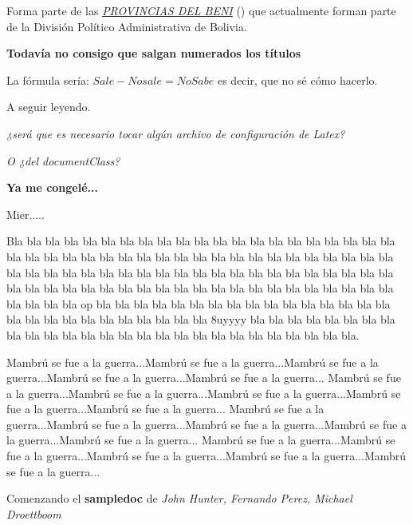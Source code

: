 \documentclass[letterpaper,10pt,english]{sphinxmanual}
\begin{document}
Forma parte de las {\hyperref[provincias:provincias]{\emph{PROVINCIAS DEL BENI}}} () que actualmente forman parte de la División Político Administrativa de Bolivia.

\textbf{Todavía no consigo que salgan numerados los títulos}

La fórmula sería: \(Sale - Nosale = NoSabe\) es decir, que no sé cómo hacerlo.

A seguir leyendo.

\emph{¿será que es necesario tocar algún archivo de configuración de Latex?}

\emph{O ¿del documentClass?}

\textbf{Ya me congelé...}

Mier.....

Bla bla bla bla bla bla bla bla bla bla bla bla bla bla bla bla bla bla bla bla bla bla bla bla bla bla bla bla bla bla bla bla bla bla
bla bla bla bla bla bla bla bla bla bla bla bla bla bla bla bla bla bla bla bla bla bla bla bla bla bla bla
bla bla bla bla bla bla bla bla bla bla bla bla bla bla bla bla bla bla bla bla bla bla bla bla bla bla bla op
bla bla bla bla bla bla bla bla bla bla bla bla bla bla bla bla bla bla bla bla bla bla bla bla bla bla bla 8uyyyy
bla bla bla bla bla bla bla bla bla bla bla bla bla bla bla bla bla bla bla bla bla bla bla bla bla bla bla.

Mambrú se fue a la guerra...Mambrú se fue a la guerra...Mambrú se fue a la guerra...Mambrú se fue a la guerra...Mambrú se fue a la guerra...
Mambrú se fue a la guerra...Mambrú se fue a la guerra...Mambrú se fue a la guerra...Mambrú se fue a la guerra...Mambrú se fue a la guerra...
Mambrú se fue a la guerra...Mambrú se fue a la guerra...Mambrú se fue a la guerra...Mambrú se fue a la guerra...Mambrú se fue a la guerra...
Mambrú se fue a la guerra...Mambrú se fue a la guerra...Mambrú se fue a la guerra...Mambrú se fue a la guerra...Mambrú se fue a la guerra...
\begin{quote}


\end{quote}

Comenzando el \textbf{sampledoc} de \emph{John Hunter, Fernando Perez, Michael Droettboom}



\renewcommand{\indexname}{Index}
\printindex
\end{document}

